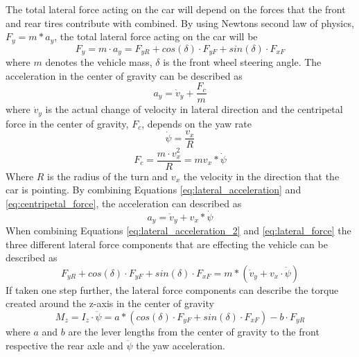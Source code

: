 The total lateral force acting on the car will depend on the forces that the front and rear tires contribute with combined. By using Newtons second law of physics, $ F_{y} = m*a_{y} $, the total lateral force acting on the car will be
\begin{equation} \label{eq:lateral_force}
	F_{y} = m \cdot a_{y} = F_{yR} + cos(\delta) \cdot F_{yF} + sin(\delta) \cdot F_{xF} 
\end{equation}
where $ m $ denotes the vehicle mass, $ \delta $ is the front wheel steering angle. The acceleration in the center of gravity can be described as 
\begin{equation} \label{eq:lateral_acceleration}
	a_{y} = \dot v_{y} + \dfrac{F_{c}}{m}
\end{equation}
where $ \dot v_{y} $ is the actual change of velocity in lateral direction and the centripetal force in the center of gravity, $ F_{c} $, depends on the yaw rate
\begin{equation} \label{eq:yaw_rate}
	\dot \psi = \dfrac{v_{x}}{R}
\end{equation}
\begin{equation} \label{eq:centripetal_force}
	F_{c} = \dfrac{m \cdot v^2_{x}}{R} = mv_{x}*\dot \psi
\end{equation}
Where $ R $ is the radius of the turn and $ v_{x} $ the velocity in the direction that the car is pointing. By combining Equations \ref{eq:lateral_acceleration} and \ref{eq:centripetal_force}, the acceleration can described as
\begin{equation} \label{eq:lateral_acceleration_2}
	a_{y} = \dot v_{y} + v_{x}*\dot \psi
\end{equation}
When combining Equations \ref{eq:lateral_acceleration_2} and \ref{eq:lateral_force} the three different lateral force components that are effecting the vehicle can be described as
\begin{equation} \label{lateral_forces_2}
	F_{yR} + cos(\delta) \cdot F_{yF} + sin(\delta) \cdot F_{xF} = m*(\dot v_{y} + v_{x} \cdot \dot \psi)
\end{equation}
If taken one step further, the lateral force components can describe the torque created around the z-axis in the center of gravity 
\begin{equation} \label{yaw_bicycle}
	M_{z} = I_{z} \cdot \ddot \psi = a*(cos(\delta) \cdot F_{yF} + sin(\delta) \cdot F_{xF}) - b \cdot F_{yR}
\end{equation}
where $ a $ and $ b $ are the lever lengths from the center of gravity to the front respective the rear axle and $ \ddot \psi $ the yaw acceleration. 

